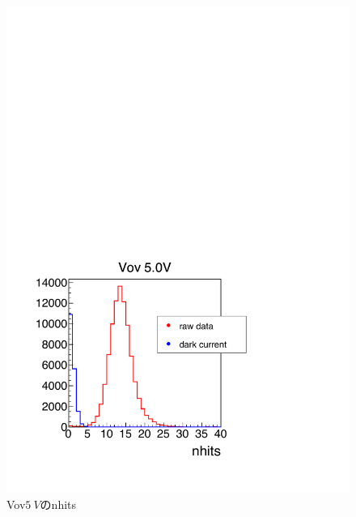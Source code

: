 \documentclass[uplatex, titlepage, dvipdfmx, 12pt, a4paper]{jsreport}
\begin{document}
    \begin{figure}[h]
      \begin{center} 
        \includegraphics[scale=0.5, clip]{image/Vov5_nhits.pdf}
        \caption{Vov$\SI{5}{V}$のnhits} 
        \label{fig:nhits} 
      \end{center}
    \end{figure}
\end{document}
